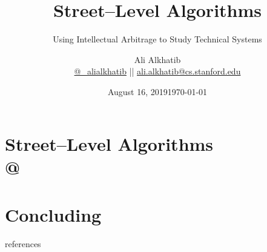 \documentclass[aspectratio=169,12pt]{beamer} %
\title{Street--Level Algorithms}
\subtitle{Using Intellectual Arbitrage to Study Technical Systems}
\author[Ali Alkhatib]{{Ali Alkhatib}\\
\href{http://twitter.com/_alialkhatib}{@\_alialkhatib} || \href{mailto:ali.alkhatib@cs.stanford.edu}{ali.alkhatib@cs.stanford.edu}}
\date{August 16, 2019}
\date{\today}
\newcommand{\onlyinsubfile}[1]{#1}
\newcommand{\notinsubfile}[1]{}
\begin{document}
\renewcommand{\onlyinsubfile}[1]{}
\renewcommand{\notinsubfile}[1]{#1}

\begin{frame}
\titlepage
\end{frame}


\def\stackalignment{l}
\def\stacktype{S}




\section{Street--Level Algorithms\\
{\hfill\footnotesize\citeauthor{streetLevelAlgorithms} @ }}



















% 

% 

\section{Concluding}



% 


\begin{frame}[allowframebreaks]{references}
  \printbibliography{}
\end{frame}
\end{document}
